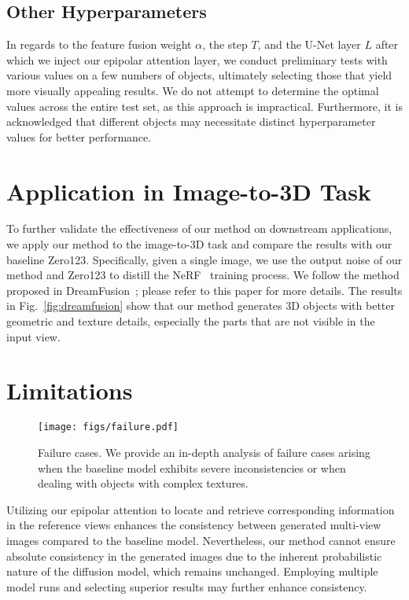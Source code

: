 \subsection{Other Hyperparameters}
In regards to the feature fusion weight $\alpha$, the step $T$, and the U-Net layer $L$ after which we inject our epipolar attention layer, we conduct preliminary tests with various values on a few numbers of objects, ultimately selecting those that yield more visually appealing results. We do not attempt to determine the optimal values across the entire test set, as this approach is impractical. Furthermore, it is acknowledged that different objects may necessitate distinct hyperparameter values for better performance.


\section{Application in Image-to-3D Task}
To further validate the effectiveness of our method on downstream applications, we apply our method to the image-to-3D task and compare the results with our baseline Zero123. Specifically, given a single image, we use the output noise of our method and Zero123 to distill the NeRF~\cite{nerf} training process. We follow the method proposed in DreamFusion~\cite{dreamfusion}; please refer to this paper for more details. The results in Fig.~\ref{fig:dreamfusion} show that our method generates 3D objects with better geometric and texture details, especially the parts that are not visible in the input view.


\section{Limitations}
\begin{figure*}[t]
    \centering
    \texttt{[image: figs/failure.pdf]}
    \caption{Failure cases. We provide an in-depth analysis of failure cases arising when the baseline model exhibits severe inconsistencies or when dealing with objects with complex textures.}
    \label{fig:failure}
\end{figure*}
Utilizing our epipolar attention to locate and retrieve corresponding information in the reference views enhances the consistency between generated multi-view images compared to the baseline model. Nevertheless, our method cannot ensure absolute consistency in the generated images due to the inherent probabilistic nature of the diffusion model, which remains unchanged. Employing multiple model runs and selecting superior results may further enhance consistency.

